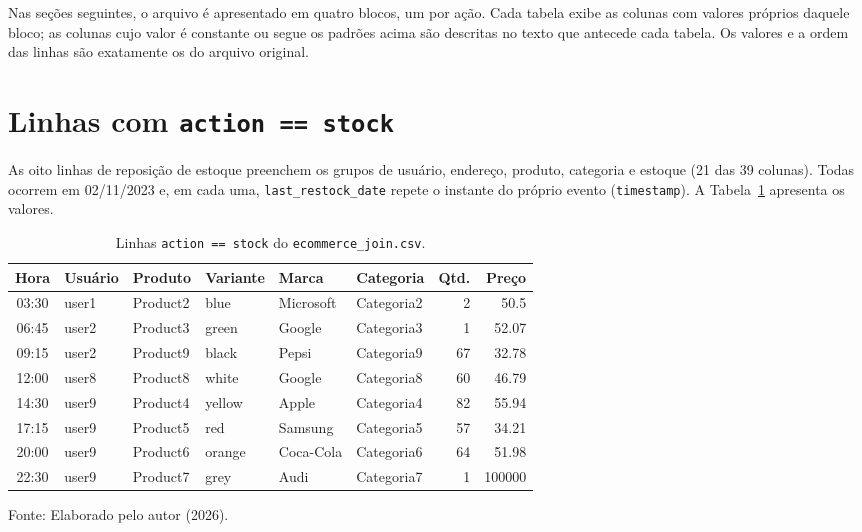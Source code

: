 Nas seções seguintes, o arquivo é apresentado em quatro blocos, um por ação. Cada
tabela exibe as colunas com valores próprios daquele bloco; as colunas cujo valor é
constante ou segue os padrões acima são descritas no texto que antecede cada tabela. Os
valores e a ordem das linhas são exatamente os do arquivo original.

\section{Linhas com \texttt{action == stock}}

As oito linhas de reposição de estoque preenchem os grupos de usuário, endereço,
produto, categoria e estoque (21 das 39 colunas). Todas ocorrem em 02/11/2023 e, em
cada uma, \texttt{last\_restock\_date} repete o instante do próprio evento
(\texttt{timestamp}). A Tabela~\ref{tab:csv-stock-ap} apresenta os valores.

\begin{table}[H]
  \caption{Linhas \texttt{action == stock} do \texttt{ecommerce\_join.csv}.}
  \label{tab:csv-stock-ap}
  \centering
  \begin{tabular}{c l l l l l r r}
    \toprule
    \textbf{Hora} & \textbf{Usuário} & \textbf{Produto} & \textbf{Variante} & \textbf{Marca} & \textbf{Categoria} & \textbf{Qtd.} & \textbf{Preço} \\
    \midrule
    03:30 & user1 & Product2 & blue   & Microsoft & Categoria2 &  2 & 50.5 \\
    06:45 & user2 & Product3 & green  & Google    & Categoria3 &  1 & 52.07 \\
    09:15 & user2 & Product9 & black  & Pepsi     & Categoria9 & 67 & 32.78 \\
    12:00 & user8 & Product8 & white  & Google    & Categoria8 & 60 & 46.79 \\
    14:30 & user9 & Product4 & yellow & Apple     & Categoria4 & 82 & 55.94 \\
    17:15 & user9 & Product5 & red    & Samsung   & Categoria5 & 57 & 34.21 \\
    20:00 & user9 & Product6 & orange & Coca-Cola & Categoria6 & 64 & 51.98 \\
    22:30 & user9 & Product7 & grey   & Audi      & Categoria7 &  1 & 100000 \\
    \bottomrule
  \end{tabular}
  \par\vspace{4pt}
  {\footnotesize Fonte: Elaborado pelo autor (2026).}
\end{table}

